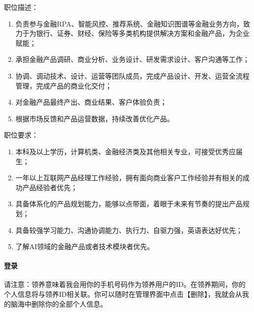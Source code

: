 \documentclass[letterpaper,10pt,english]{sphinxmanual}
\begin{document}
职位描述：
\begin{enumerate}
%
\item {} 
负责参与金融RPA、智能风控、推荐系统、金融知识图谱等金融业务方向，致力于为银行、证券、财经、保险等多类机构提供解决方案和金融产品，为企业赋能；

\item {} 
承担金融产品调研、商业分析、业务设计、研发需求设计、客户沟通等工作；

\item {} 
协调、调动技术、设计、运营等团队成员，完成产品设计、开发、运营全流程管理，完成产品的商业化交付；

\item {} 
对金融产品最终产出、商业结果、客户体验负责；

\item {} 
根据市场反馈和产品运营数据，持续改善优化产品。

\end{enumerate}

职位要求：
\begin{enumerate}
%
\item {} 
本科及以上学历，计算机类、金融经济类及其他相关专业，可接受优秀应届生；

\item {} 
一年以上互联网产品经理工作经验，拥有面向商业客户工作经验并有相关的成功产品经验者优先；

\item {} 
具备体系化的产品规划能力，能够以点带面，着眼于未来有节奏的提出产品规划；

\item {} 
具备较强学习能力、沟通协调能力、执行力、自驱力强，英语表达好优先；

\item {} 
了解AI领域的金融产品或者技术模块者优先。

\end{enumerate}


\paragraph{登录}
\label{\detokenize{chapter_AI_company/xiaoice:id7}}
请注意：领养意味着我会用你的手机号码作为领养用户的ID。在领养期间，你的个人信息将与领养ID相关联。你可以随时在管理界面中点击【删除】，我就会从我的脑海中删除你的全部个人信息。%
\begin{footnote}[1059]\sphinxAtStartFootnote
{}
%
\end{footnote}
\end{document}
